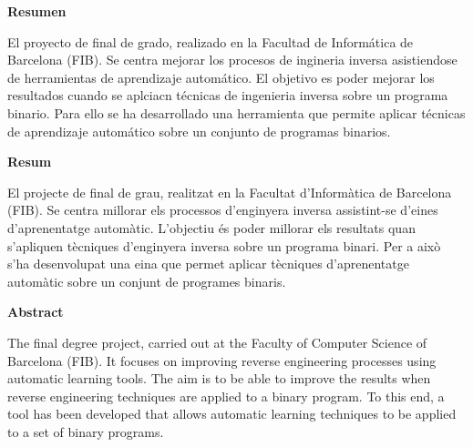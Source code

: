 \cleardoublepage

\noindent
\textbf{\huge Resumen}
\newline

El proyecto de final de grado, realizado en la Facultad de Informática de Barcelona (FIB). Se centra mejorar los procesos de ingineria inversa asistiendose 
de herramientas de aprendizaje automático. El objetivo es poder mejorar los resultados cuando se aplciacn técnicas de ingenieria inversa sobre un programa
binario. Para ello se ha desarrollado una herramienta que permite aplicar técnicas de aprendizaje automático sobre un conjunto de programas binarios. \newline

\noindent
\textbf{\huge Resum}
\newline

El projecte de final de grau, realitzat en la Facultat d'Informàtica de Barcelona (FIB). Se centra millorar els processos d'enginyera inversa assistint-se 
d'eines d'aprenentatge automàtic. L'objectiu és poder millorar els resultats quan s'apliquen tècniques d'enginyera inversa sobre un programa
binari. Per a això s'ha desenvolupat una eina que permet aplicar tècniques d'aprenentatge automàtic sobre un conjunt de programes binaris. \newline

\noindent
\textbf{\huge Abstract}
\newline

The final degree project, carried out at the Faculty of Computer Science of Barcelona (FIB). It focuses on improving reverse engineering processes using automatic
learning tools. The aim is to be able to improve the results when reverse engineering techniques are applied to a binary program. To this end, a tool has been developed
that allows automatic learning techniques to be applied to a set of binary programs. \newline
